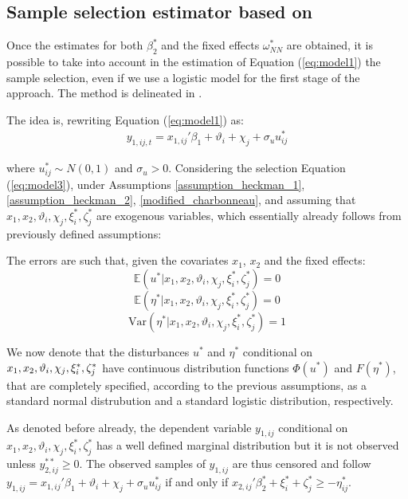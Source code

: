 \subsection{Sample selection estimator based on \cite{lee1983generalized}} \label{sample_selection}

Once the estimates for both $\beta^*_2$ and the fixed effects $\omega_{NN}^*$ are obtained, it is possible to take into account in the estimation of Equation (\ref{eq:model1}) the sample selection, even if we use a logistic model for the first stage of the \cite{heckman1979sample} approach. The method is delineated in \cite{lee1983generalized}. 

The idea is, rewriting Equation (\ref{eq:model1}) as:
\begin{align}
y_{1,ij,t} = x_{1,ij}'\beta_1 + \vartheta_i + \chi_j + \sigma_u u_{ij}^*
\label{eq:lee1}
\end{align}

\noindent where $u_{i j}^* \sim N(0,1)$ and $\sigma_u > 0$. Considering the selection Equation (\ref{eq:model3}), under Assumptions \ref{assumption_heckman_1}, \ref{assumption_heckman_2}, \ref{modified_charbonneau}, and assuming that $x_1, x_2, \vartheta_i, \chi_j, \xi_i^*, \zeta_j^*$ are exogenous variables, which essentially already follows from previously defined assumptions: 

\begin{assumption} \label{assumption_lee}
  The errors are such that, given the covariates $x_1$, $x_2$ and the fixed effects: 
  $$\mathbb{E} (u^* \rvert x_1, x_2, \vartheta_i, \chi_j, \xi_i^*, \zeta_j^*) = 0$$ 
  $$\mathbb{E} (\eta^* \rvert  x_1, x_2, \vartheta_i, \chi_j, \xi_i^*, \zeta_j^*) = 0$$
  $$\text{Var} (\eta^* \rvert  x_1, x_2, \vartheta_i, \chi_j, \xi_i^*, \zeta_j^*) = 1$$
\end{assumption}

We now denote that the disturbances $u^*$ and $\eta^*$ conditional on $x_1, x_2, \vartheta_i, \\ \chi_j, \xi_i^*, \zeta_j^*$ have continuous distribution functions $\Phi(u^*)$ and $F(\eta^*)$, that are completely specified, according to the previous assumptions, as a standard normal distrubution and a standard logistic distribution, respectively.

As denoted before already, the dependent variable $y_{1,ij}$ conditional on $x_1, x_2, \vartheta_i, \chi_j, \xi_i^*, \zeta_j^*$ has a well defined marginal distribution but it is not observed unless $y_{2,ij}^{**} \geq 0$. The observed samples of $y_{1,ij}$ are thus censored and follow $y_{1,ij} =  x_{1,ij}'{\beta_1} + \vartheta_i + \chi_j + \sigma_u u_{ij}^*$ if and only if $x_{2,ij}'{\beta_2^*}  +\xi_{i}^*+\zeta_{j}^* \geq - \eta^*_{i j}$.

